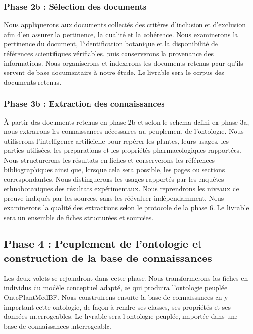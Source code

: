 \subsubsection*{Phase 2b : Sélection des documents}

Nous appliquerons aux documents collectés des critères d'inclusion et d'exclusion afin d'en assurer la pertinence, la qualité et la cohérence. Nous examinerons la pertinence du document, l'identification botanique et la disponibilité de références scientifiques vérifiables, puis conserverons la provenance des informations. Nous organiserons et indexerons les documents retenus pour qu'ils servent de base documentaire à notre étude. Le livrable sera le corpus des documents retenus.

\subsubsection*{Phase 3b : Extraction des connaissances}

À partir des documents retenus en phase 2b et selon le schéma défini en phase 3a, nous extrairons les connaissances nécessaires au peuplement de l'ontologie. Nous utiliserons l'intelligence artificielle pour repérer les plantes, leurs usages, les parties utilisées, les préparations et les propriétés pharmacologiques rapportées. Nous structurerons les résultats en fiches et conserverons les références bibliographiques ainsi que, lorsque cela sera possible, les pages ou sections correspondantes. Nous distinguerons les usages rapportés par les enquêtes ethnobotaniques des résultats expérimentaux. Nous reprendrons les niveaux de preuve indiqués par les sources, sans les réévaluer indépendamment. Nous examinerons la qualité des extractions selon le protocole de la phase 6. Le livrable sera un ensemble de fiches structurées et sourcées.

\subsection*{Phase 4 : Peuplement de l'ontologie et construction de la base de connaissances}

Les deux volets se rejoindront dans cette phase. Nous transformerons les fiches en individus du modèle conceptuel adapté, ce qui produira l'ontologie peuplée OntoPlantMedBF. Nous construirons ensuite la base de connaissances en y important cette ontologie, de façon à rendre ses classes, ses propriétés et ses données interrogeables. Le livrable sera l'ontologie peuplée, importée dans une base de connaissances interrogeable.

